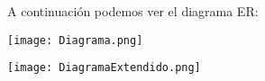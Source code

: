\documentclass{article}
\begin{document}
A continuación podemos ver el diagrama ER:

\begin{center}
    \texttt{[image: Diagrama.png]}
\end{center}

\begin{center}
    \texttt{[image: DiagramaExtendido.png]}
\end{center}
\end{document}

